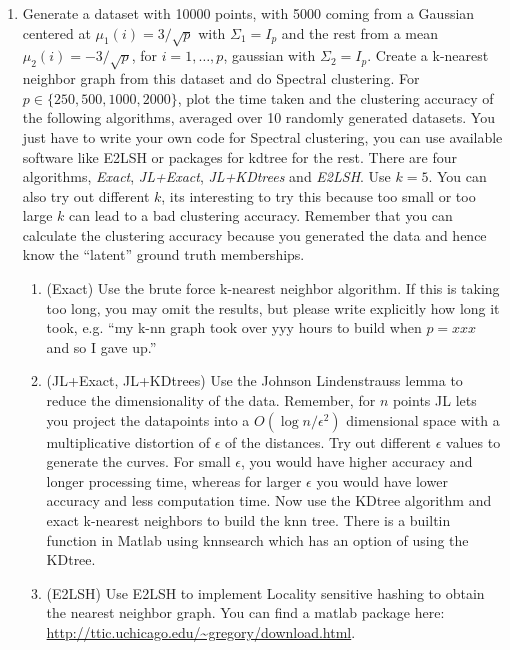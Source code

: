 \documentclass[11pt]{article}
\begin{document}
\begin{enumerate}

\begin{enumerate}
	\item Generate a dataset with 10000 points, with 5000 coming from a Gaussian centered at $\mu_1(i)=3/\sqrt{p}$  with $\Sigma_1=I_p$ and the rest from a mean $\mu_2(i)=-3/\sqrt{p}$, for $i=1,\dots,p$, gaussian with $\Sigma_2=I_p$. Create a k-nearest neighbor graph from this dataset and do Spectral clustering. For $p\in\{250,500,1000,2000\}$, plot the time taken and the clustering accuracy of the following algorithms, averaged over 10 randomly generated datasets. You just have to write your own code for Spectral clustering, you can use available software like E2LSH or packages for kdtree for the rest. There are four algorithms, \textit{Exact}, \textit{JL+Exact}, \textit{JL+KDtrees} and \textit{E2LSH}. Use $k=5$. You can also try out different $k$, its interesting to try this because too small or too large $k$ can lead to a bad clustering accuracy. Remember that you can calculate the clustering accuracy because you generated the data and hence know the ``latent'' ground truth memberships.
\begin{enumerate}
	\item (Exact) Use the brute force k-nearest neighbor algorithm. If this is taking too long, you may omit the results, but please write explicitly how long it took, e.g. ``my k-nn graph took over yyy hours to build when $p=xxx$ and so I gave up.''
	\item (JL+Exact, JL+KDtrees) Use the Johnson Lindenstrauss lemma to reduce the dimensionality of the data. Remember, for $n$ points JL lets you project the datapoints into a $O(\log n/\epsilon^2)$ dimensional space with a multiplicative distortion of $\epsilon$ of the distances. Try out different $\epsilon$ values to generate the curves. For small $\epsilon$, you would have higher accuracy and longer processing time, whereas for larger $\epsilon$ you would have lower accuracy and less computation time. Now use the KDtree algorithm and exact k-nearest neighbors to build the knn tree. There is a builtin function in Matlab using knnsearch which has an option of using the KDtree.
	\item (E2LSH) Use E2LSH to implement Locality sensitive hashing to obtain the nearest neighbor graph. You can find a matlab package here:
	\url{http://ttic.uchicago.edu/~gregory/download.html}.
	\end{enumerate}
\end{enumerate}
\newcommand{\bx}{\boldsymbol{x}}
\newcommand{\bv}{\boldsymbol{v}}
\newcommand{\ba}{\boldsymbol{a}}


\end{enumerate}
\end{document}
